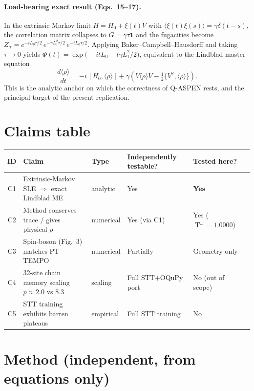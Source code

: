 \documentclass[11pt]{article}
\begin{document}
\paragraph{Load-bearing exact result (Eqs.~15--17).}
In the extrinsic Markov limit $H=H_0+\xi(t)V$ with
$\langle \xi(t)\xi(s)\rangle=\gamma\delta(t-s)$, the correlation matrix collapses
to $G=\gamma\tau\mathbf{1}$ and the fugacities become
$Z_\alpha = e^{-iL_0\tau/2}\, e^{-\gamma L_1^2 \tau/2}\, e^{-iL_0\tau/2}$.
Applying Baker--Campbell--Hausdorff and taking $\tau\to 0$ yields
$\Phi(t)=\exp\!\big({-}itL_0 - t\gamma L_1^2/2\big)$, equivalent to the
Lindblad master equation
\begin{equation}
\frac{d\langle \rho\rangle}{dt}
= -i\,[H_0,\langle \rho\rangle]
+ \gamma\!\left(V\langle \rho\rangle V - \tfrac{1}{2}\{V^2,\langle \rho\rangle\}\right).
\label{eq:lindblad}
\end{equation}
This is the analytic anchor on which the correctness of Q-ASPEN rests, and the
principal target of the present replication.

\section{Claims table}

\begin{center}
\begin{tabular}{clllll}
\toprule
ID & Claim & Type & Independently testable? & Tested here? \\
\midrule
C1 & Extrinsic-Markov SLE $\Rightarrow$ exact Lindblad ME & analytic & Yes & \textbf{Yes} \\
C2 & Method conserves trace / gives physical $\rho$ & numerical & Yes (via C1) & Yes ($\operatorname{Tr}{=}1.0000$) \\
C3 & Spin-boson (Fig.~3) matches PT-TEMPO & numerical & Partially & Geometry only \\
C4 & 32-site chain memory scaling $p\!\approx\!2.0$ vs $8.3$ & scaling & Full STT+OQuPy port & No (out of scope) \\
C5 & STT training exhibits barren plateaus & empirical & Full STT training & No \\
\bottomrule
\end{tabular}
\end{center}

\section{Method (independent, from equations only)}
\end{document}
